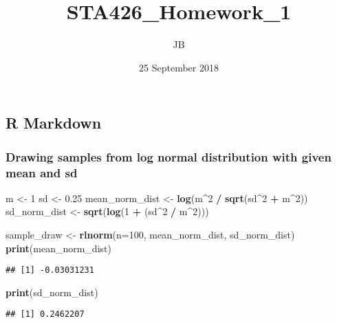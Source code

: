 \documentclass[]{article}
\title{STA426\_Homework\_1}
\author{JB}
\date{25 September 2018}
\newenvironment{Shaded}{\begin{snugshade}}{\end{snugshade}}
\newcommand{\KeywordTok}[1]{\textcolor[rgb]{0.13,0.29,0.53}{\textbf{#1}}}
\newcommand{\DataTypeTok}[1]{\textcolor[rgb]{0.13,0.29,0.53}{#1}}
\newcommand{\DecValTok}[1]{\textcolor[rgb]{0.00,0.00,0.81}{#1}}
\newcommand{\FloatTok}[1]{\textcolor[rgb]{0.00,0.00,0.81}{#1}}
\newcommand{\StringTok}[1]{\textcolor[rgb]{0.31,0.60,0.02}{#1}}
\newcommand{\OperatorTok}[1]{\textcolor[rgb]{0.81,0.36,0.00}{\textbf{#1}}}
\newcommand{\NormalTok}[1]{#1}
\begin{document}
\maketitle

\subsection{R Markdown}\label{r-markdown}

\subsubsection{Drawing samples from log normal distribution with given
mean and
sd}\label{drawing-samples-from-log-normal-distribution-with-given-mean-and-sd}

\begin{Shaded}
\begin{Highlighting}[]
\NormalTok{m <-}\StringTok{ }\DecValTok{1}
\NormalTok{sd <-}\StringTok{ }\FloatTok{0.25}
\NormalTok{mean_norm_dist <-}\StringTok{ }\KeywordTok{log}\NormalTok{(m}\OperatorTok{^}\DecValTok{2} \OperatorTok{/}\StringTok{ }\KeywordTok{sqrt}\NormalTok{(sd}\OperatorTok{^}\DecValTok{2} \OperatorTok{+}\StringTok{ }\NormalTok{m}\OperatorTok{^}\DecValTok{2}\NormalTok{))}
\NormalTok{sd_norm_dist <-}\StringTok{ }\KeywordTok{sqrt}\NormalTok{(}\KeywordTok{log}\NormalTok{(}\DecValTok{1} \OperatorTok{+}\StringTok{ }\NormalTok{(sd}\OperatorTok{^}\DecValTok{2} \OperatorTok{/}\StringTok{ }\NormalTok{m}\OperatorTok{^}\DecValTok{2}\NormalTok{)))}

\NormalTok{sample_draw <-}\StringTok{ }\KeywordTok{rlnorm}\NormalTok{(}\DataTypeTok{n=}\DecValTok{100}\NormalTok{, mean_norm_dist, sd_norm_dist)}
\KeywordTok{print}\NormalTok{(mean_norm_dist)}
\end{Highlighting}
\end{Shaded}

\begin{verbatim}
## [1] -0.03031231
\end{verbatim}

\begin{Shaded}
\begin{Highlighting}[]
\KeywordTok{print}\NormalTok{(sd_norm_dist)}
\end{Highlighting}
\end{Shaded}

\begin{verbatim}
## [1] 0.2462207
\end{verbatim}
\end{document}

